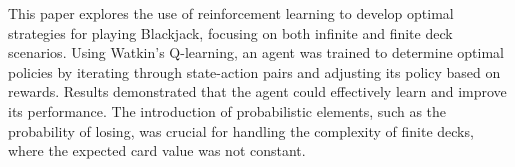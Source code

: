 This paper explores the use of reinforcement learning to develop optimal strategies for playing Blackjack, focusing on both infinite and finite deck scenarios. Using Watkin's Q-learning, an agent was trained to determine optimal policies by iterating through state-action pairs and adjusting its policy based on rewards. Results demonstrated that the agent could effectively learn and improve its performance. The introduction of probabilistic elements, such as the probability of losing, was crucial for handling the complexity of finite decks, where the expected card value was not constant. 